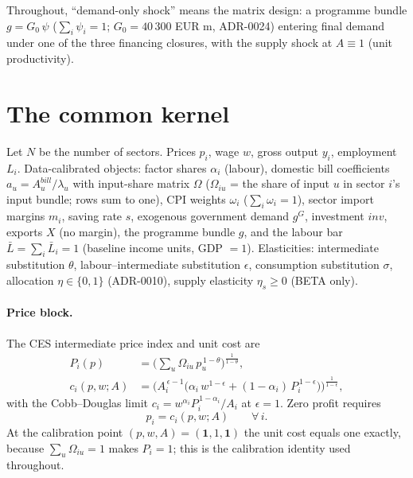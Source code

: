 \documentclass[11pt]{article}
\numberwithin{equation}{section}
\newcommand{\Lbar}{\bar{L}}
\newcommand{\one}{\mathbf{1}}
\begin{document}
Throughout, ``demand-only shock'' means the matrix design: a programme bundle
$g = G_0\,\psi$ \textcolor{revisionV3}{($\sum_i \psi_i = 1$; $G_0 = 40\,300$
EUR m, ADR-0024)} entering final demand under one of the three financing
closures, with the supply shock at $A \equiv 1$ (unit productivity).

\section{The common kernel}\label{sec:kernel}

Let $N$ be the number of sectors. Prices $p_i$, wage $w$, gross output
$y_i$, employment $L_i$. Data-calibrated objects: factor shares $\alpha_i$
(labour), domestic bill coefficients $a_u = A^{bill}_u/\lambda_u$ with
input-share matrix $\Omega$ (\textcolor{revisionV3}{$\Omega_{iu}$ = the share of input
$u$ in sector $i$'s input bundle}; rows sum to one), CPI weights $\omega_i$ ($\sum_i \omega_i = 1$),
sector import margins $m_i$, saving rate $s$, exogenous government demand
$g^G$, investment $inv$, exports $X$ (no margin), the programme bundle $g$,
and the labour bar $\Lbar = \sum_i \bar{L}_i = 1$ (baseline income units,
GDP $=1$). Elasticities: intermediate substitution $\theta$,
labour--intermediate substitution $\epsilon$, consumption substitution
$\sigma$, allocation $\eta \in \{0,1\}$ (ADR-0010), supply elasticity
$\eta_s \geq 0$ (BETA only).

\paragraph{Price block.} The CES intermediate price index and unit cost are
\begin{align}
P_i(p) &= \Big( \textstyle\sum_u \Omega_{iu}\, p_u^{\,1-\theta}
   \Big)^{\frac{1}{1-\theta}}, \label{eq:ip}\\
c_i(p,w;A) &= \Big( A_i^{\,\epsilon-1}\big( \alpha_i\, w^{1-\epsilon}
   + (1-\alpha_i)\, P_i^{\,1-\epsilon} \big) \Big)^{\frac{1}{1-\epsilon}},
   \label{eq:cost}
\end{align}
with the Cobb--Douglas limit $c_i = w^{\alpha_i} P_i^{\,1-\alpha_i}/A_i$ at
$\epsilon = 1$. Zero profit requires
\begin{equation}
p_i = c_i(p,w;A) \qquad \forall\, i. \label{eq:zp}
\end{equation}
At the calibration point $(p,w,A) = (\one,1,\one)$ the unit cost equals one
exactly, because $\sum_u \Omega_{iu} = 1$ makes $P_i = 1$; this is the
calibration identity used throughout.
\end{document}
